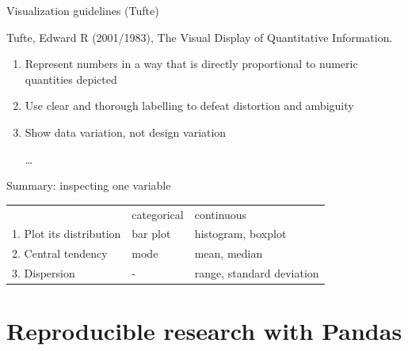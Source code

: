 \documentclass[aspectratio=169,usenames,dvipsnames]{beamer}
\begin{document}
\begin{frame}{Visualization guidelines (Tufte)}
    \begin{reference}
        Tufte, Edward R (2001/1983), The Visual Display of Quantitative Information.
    \end{reference}
\begin{enumerate}
    \item Represent numbers in a way that is directly proportional to numeric quantities depicted
    \item Use clear and thorough labelling to defeat distortion and ambiguity
    \item Show data variation, not design variation
    \item [\dots]
\end{enumerate}
\end{frame}

\begin{frame}{Summary: inspecting one variable}
\noindent\begin{tabular}{@{}lll} & categorical & continuous \\
        1. Plot its distribution & bar plot    & histogram, boxplot \\
        2. Central tendency      & mode        & mean, median \\
        3. Dispersion            & -           & range, standard deviation \\
\end{tabular}
\end{frame}




\section{Reproducible research with Pandas}
\frame{\tableofcontents[currentsubsection]}
\end{document}
